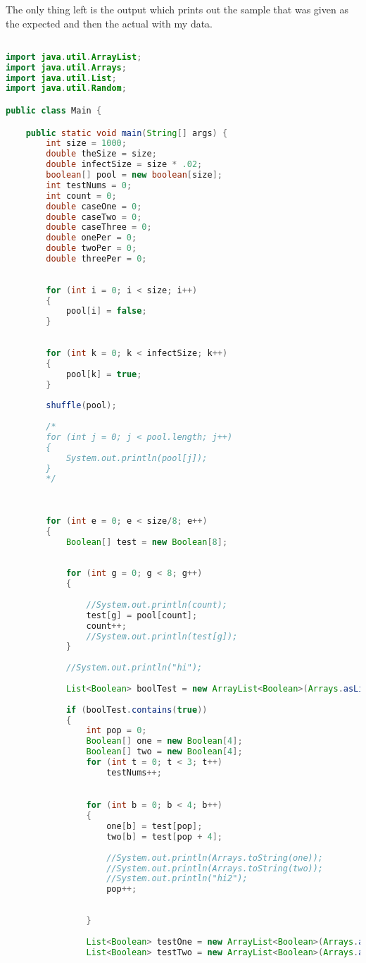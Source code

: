 \documentclass[letterpaper, 10pt]{article}
\begin{document}
The only thing left is the output which prints out the sample that was given as the expected and then the actual with my data.\par
\begin{lstlisting}[language = java]

import java.util.ArrayList;
import java.util.Arrays;
import java.util.List;
import java.util.Random;

public class Main {

	public static void main(String[] args) {
		int size = 1000;
		double theSize = size;
		double infectSize = size * .02;
		boolean[] pool = new boolean[size];
		int testNums = 0;
		int count = 0;
		double caseOne = 0;
		double caseTwo = 0;
		double caseThree = 0;
		double onePer = 0;
		double twoPer = 0;
		double threePer = 0;
		
		
		for (int i = 0; i < size; i++)
		{
			pool[i] = false;
		}
		
		
		for (int k = 0; k < infectSize; k++)
		{
			pool[k] = true;
		}
		
		shuffle(pool);
		
		/*
		for (int j = 0; j < pool.length; j++)
		{
			System.out.println(pool[j]);
		}
		*/
		
		
		
		for (int e = 0; e < size/8; e++)
		{
			Boolean[] test = new Boolean[8];
			
			
			for (int g = 0; g < 8; g++)
			{
				
				//System.out.println(count);
				test[g] = pool[count];
				count++;
				//System.out.println(test[g]);
			}
			
			//System.out.println("hi");
			
			List<Boolean> boolTest = new ArrayList<Boolean>(Arrays.asList(test));
			
			if (boolTest.contains(true))
			{
				int pop = 0;
				Boolean[] one = new Boolean[4];
				Boolean[] two = new Boolean[4];
				for (int t = 0; t < 3; t++)
					testNums++;

				
				for (int b = 0; b < 4; b++)
				{
					one[b] = test[pop];
					two[b] = test[pop + 4];
					
					//System.out.println(Arrays.toString(one));
					//System.out.println(Arrays.toString(two));
					//System.out.println("hi2");
					pop++;
					
					
				}
				
				List<Boolean> testOne = new ArrayList<Boolean>(Arrays.asList(one));
				List<Boolean> testTwo = new ArrayList<Boolean>(Arrays.asList(two));
				

\end{lstlisting}
\end{document}
